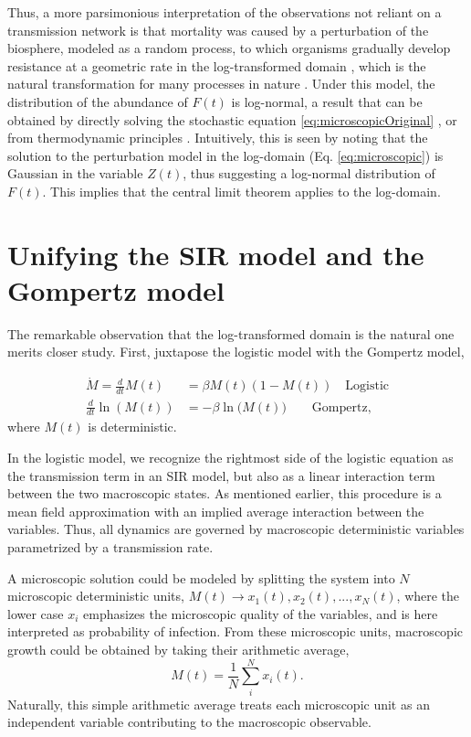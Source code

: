 \documentclass{article}
\begin{document}
Thus, a more parsimonious interpretation of the observations not reliant on a transmission network is that mortality was caused by a perturbation of the biosphere, modeled as a random process, to which organisms gradually develop resistance at a geometric rate in the log-transformed domain \cite{boxenbaum2017hypotheses,neafsey1988gompertz}, which is the natural transformation for many processes in nature \cite{zhang1994log}. 
Under this model, the distribution of the abundance of $F(t)$ is log-normal, a result that can be obtained by directly solving the stochastic equation \ref{eq:microscopicOriginal} \cite{skiadas2010exact,petroni2020gompertz}, or from thermodynamic principles \cite{sitaram1984statistical,gunasekaran1982lon,chakrabarti1996non}. 
Intuitively, this is seen by noting that the solution to the perturbation model in the log-domain (Eq. \ref{eq:microscopic}) is Gaussian in the variable $Z(t)$, thus suggesting a log-normal distribution of $F(t)$. This implies that the central limit theorem applies to the log-domain.

\section*{Unifying the SIR model and the Gompertz model}
The remarkable observation that the log-transformed domain is the natural one merits closer study. First, juxtapose the logistic model with the Gompertz model,

\begin{subequations}
\begin{align}
\dot{M} = \frac{d}{dt}M(t) & = \beta M(t) (1-M(t)) \quad \text{Logistic}\label{eq:compareLog}\\ 
\frac{d}{dt}\ln{(M(t))} & = -\beta \ln{(M(t)}) \quad\quad\text{Gompertz}\label{eq:compareGom},
\end{align}
\end{subequations}
where $M(t)$ is deterministic. 

In the logistic model, we recognize the rightmost side of the logistic equation as the transmission term in an SIR model, but also as a linear interaction term between the two macroscopic states. 
As mentioned earlier, this procedure is a mean field approximation with an implied average interaction between the variables. 
Thus, all dynamics are governed by macroscopic deterministic variables parametrized by a transmission rate.

A microscopic solution could be modeled by splitting the system into $N$ microscopic deterministic units, $M(t) \rightarrow x_1(t), x_2(t), ..., x_N(t)$, where the lower case $x_i$ emphasizes the microscopic quality of the variables, and is here interpreted as probability of infection. From these microscopic units, macroscopic growth could be obtained by taking their arithmetic average,
\begin{equation}
M(t) = \frac{1}{N}\sum_i^N x_i(t).
\end{equation}
Naturally, this simple arithmetic average treats each microscopic unit as an independent variable contributing to the macroscopic observable.
\end{document}
